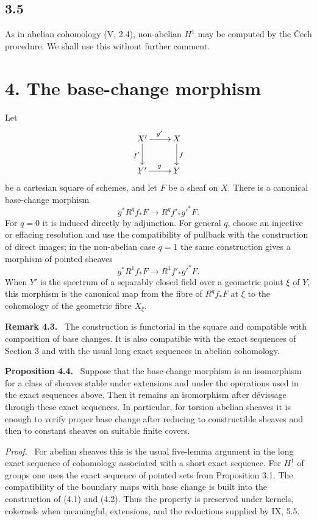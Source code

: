 \documentclass[11pt]{article}
\newenvironment{statement}[1]{\par\medskip\noindent\textbf{#1.}\ }{\par\medskip}
\newenvironment{remarktext}[1]{\par\medskip\noindent\textbf{#1.}\ }{\par\medskip}
\newenvironment{prooftext}{\par\noindent\emph{Proof.}\ }{\par\medskip}
\begin{document}
\subsection*{3.5}
As in abelian cohomology (V, 2.4), non-abelian \(H^1\) may be computed by the \v{C}ech procedure. We shall use this without further comment.

\section*{4. The base-change morphism}
Let
\[
\xymatrix{
X'\ar[r]^{g'}\ar[d]_{f'}&X\ar[d]^f\\
Y'\ar[r]^g&Y
}
\]
be a cartesian square of schemes, and let \(F\) be a sheaf on \(X\). There is a canonical base-change morphism
\[
g^*R^qf_*F\longrightarrow R^qf'_*g'^*F.
\tag{4.1}
\]
For \(q=0\) it is induced directly by adjunction. For general \(q\), choose an injective or effacing resolution and use the compatibility of pullback with the construction of direct images; in the non-abelian case \(q=1\) the same construction gives a morphism of pointed sheaves
\[
g^*R^1f_*F\longrightarrow R^1f'_*g'^*F.
\tag{4.2}
\]
When \(Y'\) is the spectrum of a separably closed field over a geometric point \(\xi\) of \(Y\), this morphism is the canonical map from the fibre of \(R^qf_*F\) at \(\xi\) to the cohomology of the geometric fibre \(X_\xi\).

\begin{remarktext}{Remark 4.3}
The construction is functorial in the square and compatible with composition of base changes. It is also compatible with the exact sequences of Section 3 and with the usual long exact sequences in abelian cohomology.
\end{remarktext}

\begin{statement}{Proposition 4.4}
Suppose that the base-change morphism is an isomorphism for a class of sheaves stable under extensions and under the operations used in the exact sequences above. Then it remains an isomorphism after dévissage through these exact sequences. In particular, for torsion abelian sheaves it is enough to verify proper base change after reducing to constructible sheaves and then to constant sheaves on suitable finite covers.
\end{statement}

\begin{prooftext}
For abelian sheaves this is the usual five-lemma argument in the long exact sequence of cohomology associated with a short exact sequence. For \(H^1\) of groups one uses the exact sequence of pointed sets from Proposition 3.1. The compatibility of the boundary maps with base change is built into the construction of (4.1) and (4.2). Thus the property is preserved under kernels, cokernels when meaningful, extensions, and the reductions supplied by IX, 5.5.
\end{prooftext}
\end{document}
